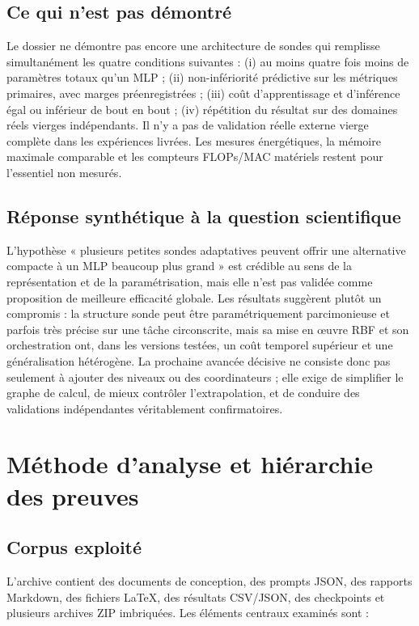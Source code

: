 \documentclass[11pt,a4paper]{article}
\begin{document}
\subsection{Ce qui n'est pas démontré}

Le dossier ne démontre pas encore une architecture de sondes qui remplisse simultanément les quatre conditions suivantes : (i) au moins quatre fois moins de paramètres totaux qu'un MLP ; (ii) non-infériorité prédictive sur les métriques primaires, avec marges préenregistrées ; (iii) coût d'apprentissage et d'inférence égal ou inférieur de bout en bout ; (iv) répétition du résultat sur des domaines réels vierges indépendants. Il n'y a pas de validation réelle externe vierge complète dans les expériences livrées. Les mesures énergétiques, la mémoire maximale comparable et les compteurs FLOPs/MAC matériels restent pour l'essentiel non mesurés.

\subsection{Réponse synthétique à la question scientifique}

L'hypothèse « plusieurs petites sondes adaptatives peuvent offrir une alternative compacte à un MLP beaucoup plus grand » est crédible au sens de la représentation et de la paramétrisation, mais elle n'est pas validée comme proposition de meilleure efficacité globale. Les résultats suggèrent plutôt un compromis : la structure sonde peut être paramétriquement parcimonieuse et parfois très précise sur une tâche circonscrite, mais sa mise en œuvre RBF et son orchestration ont, dans les versions testées, un coût temporel supérieur et une généralisation hétérogène. La prochaine avancée décisive ne consiste donc pas seulement à ajouter des niveaux ou des coordinateurs ; elle exige de simplifier le graphe de calcul, de mieux contrôler l'extrapolation, et de conduire des validations indépendantes véritablement confirmatoires.

\section{Méthode d'analyse et hiérarchie des preuves}

\subsection{Corpus exploité}

L'archive contient des documents de conception, des prompts JSON, des rapports Markdown, des fichiers LaTeX, des résultats CSV/JSON, des checkpoints et plusieurs archives ZIP imbriquées. Les éléments centraux examinés sont :
\end{document}
